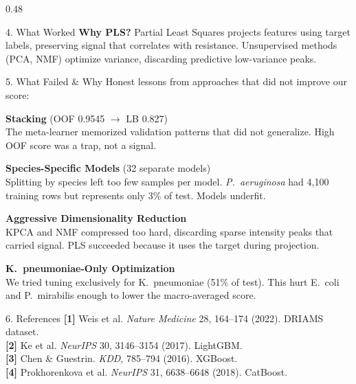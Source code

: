 \documentclass[final]{beamer}
\begin{document}
\begin{frame}[t]
\begin{columns}[t,totalwidth=\textwidth]
\begin{column}{0.48\textwidth}
\begin{block}{4. What Worked}
\vspace{0.5em}
\textbf{Why PLS?} Partial Least Squares projects features using target labels, preserving signal that correlates with resistance. Unsupervised methods (PCA, NMF) optimize variance, discarding predictive low-variance peaks.
\end{block}

\begin{block}{5. What Failed \& Why}
Honest lessons from approaches that did not improve our score:

\vspace{0.6em}
\textbf{Stacking} (OOF 0.9545 $\rightarrow$ LB 0.827)\\[0.2em]
The meta-learner memorized validation patterns that did not generalize. High OOF score was a trap, not a signal.

\vspace{0.5em}
\textbf{Species-Specific Models} (32 separate models)\\[0.2em]
Splitting by species left too few samples per model. \textit{P.~aeruginosa} had 4,100 training rows but represents only 3\% of test. Models underfit.

\vspace{0.5em}
\textbf{Aggressive Dimensionality Reduction}\\[0.2em]
KPCA and NMF compressed too hard, discarding sparse intensity peaks that carried signal. PLS succeeded because it uses the target during projection.

\vspace{0.5em}
\textbf{K.~pneumoniae-Only Optimization}\\[0.2em]
We tried tuning exclusively for K.~pneumoniae (51\% of test). This hurt E.~coli and P.~mirabilis enough to lower the macro-averaged score.

\vspace{0.8em}
\begin{center}
\end{center}
\end{block}

\vfill

\begin{block}{6. References}
\vspace{0.2em}
{\small
\textbf{[1]} Weis et al. \textit{Nature Medicine} 28, 164--174 (2022). DRIAMS dataset.\\[0.2em]
\textbf{[2]} Ke et al. \textit{NeurIPS} 30, 3146--3154 (2017). LightGBM.\\[0.2em]
\textbf{[3]} Chen \& Guestrin. \textit{KDD}, 785--794 (2016). XGBoost.\\[0.2em]
\textbf{[4]} Prokhorenkova et al. \textit{NeurIPS} 31, 6638--6648 (2018). CatBoost.
}
\end{block}


\end{column}
\end{columns}
\end{frame}
\end{document}
